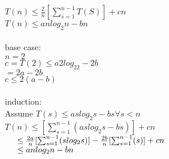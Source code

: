 \documentclass{article}
\begin{document}
\begin{description}
\begin{itemize}
$T(n) \leq \frac{2}{n} [\sum_{s=1}^{n-1} T(S)] + cn$\\
$T(n) \leq anlog_2n - bn$\\
\\
base case:\\
$n=2$\\
$c = T(2) \leq a2log_22 - 2b$\\
$=2a-2b$\\
$c \leq 2(a-b)$\\
\\
induction:\\
Assume $T(s) \leq aslog_2s - bs \forall  s<n$\\
$T(n) \leq [\sum_{s=1}^{n-1} (aslog_2s - bs)]+cn$\\
$\hspace*{5mm}\leq \frac{2a}{n}[\sum_{s=1}^{n-1} (slog_2s)] - \frac{2b}{n}[\sum_{s=1}^{n-1} (s)] + cn$\\
$\hspace*{5mm}\leq anlog_2n - bn$\\
\end{itemize}
\vspace{5mm}


\end{description}
\end{document}
